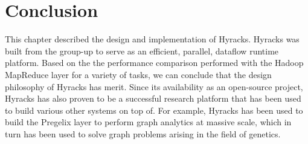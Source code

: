 \section{Conclusion}

This chapter described the design and implementation of Hyracks. Hyracks was built from the group-up to serve as an efficient, parallel, dataflow runtime platform. Based on the the performance comparison performed with the Hadoop MapReduce layer for a variety of tasks, we can conclude that the design philosophy of Hyracks has merit. Since its availability as an open-source project, Hyracks has also proven to be a successful research platform that has been used to build various other systems on top of. For example, Hyracks has been used to build the Pregelix layer to perform graph analytics at massive scale, which in turn has been used to solve graph problems arising in the field of genetics.
